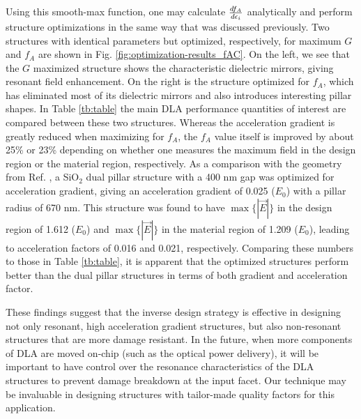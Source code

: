 Using this smooth-max function, one may calculate $\frac{d f_{A}}{d \epsilon_i}$ analytically and perform structure optimizations in the same way that was discussed previously.
Two structures with identical parameters but optimized, respectively, for maximum $G$ and $f_A$ are shown in Fig. \ref{fig:optimization-results_fAC}.
On the left, we see that the $G$ maximized structure shows the characteristic dielectric mirrors, giving resonant field enhancement.
On the right is the structure optimized for $f_A$, which has eliminated most of its dielectric mirrors and also introduces interesting pillar shapes.
In Table \ref{tb:table} the main DLA performance quantities of interest are compared between these two structures.
Whereas the acceleration gradient is greatly reduced when maximizing for $f_A$, the $f_A$ value itself is improved by about 25\% or 23\% depending on whether one measures the maximum field in the design region or the material region, respectively.
As a comparison with the geometry from Ref. \cite{leedle2015dielectric}, a SiO$_2$ dual pillar structure with a 400 nm gap was optimized for acceleration gradient, giving an acceleration gradient of 0.025 ($E_0$) with a pillar radius of 670 nm.
This structure was found to have $\max\{|\vec{E}|\}$ in the design region of 1.612 ($E_0$) and $\max\{|\vec{E}|\}$ in the material region of 1.209 ($E_0$), leading to acceleration factors of 0.016 and 0.021, respectively.
Comparing these numbers to those in Table \ref{tb:table}, it is apparent that the optimized structures perform better than the dual pillar structures in terms of both gradient and acceleration factor.

These findings suggest that the inverse design strategy is effective in designing not only resonant, high acceleration gradient structures, but also non-resonant structures that are more damage resistant.
In the future, when more components of DLA are moved on-chip (such as the optical power delivery), it will be important to have control over the resonance characteristics of the DLA structures to prevent damage breakdown at the input facet.
Our technique may be invaluable in designing structures with tailor-made quality factors for this application.



